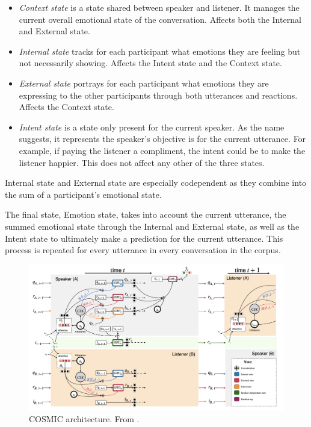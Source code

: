 \documentclass[nofilelist]{cslthse-msc}
\begin{document}
\begin{itemize}
    \item \textit{Context state} is a state shared between speaker and listener. It manages the current overall emotional state of the conversation. Affects both the Internal and External state.
    \item \textit{Internal state} tracks for each participant what emotions they are feeling but not necessarily showing. Affects the Intent state and the Context state.
    \item \textit{External state} portrays for each participant what emotions they are expressing to the other participants through both utterances and reactions. Affects the Context state.
    \item \textit{Intent state} is a state only present for the current speaker. As the name suggests, it represents the speaker's objective is for the current utterance. For example, if paying the listener a compliment, the intent could be to make the listener happier. This does not affect any other of the three states.
\end{itemize}
Internal state and External state are especially codependent as they combine into the sum of a participant's emotional state. 

The final state, Emotion state, takes into account the current utterance, the summed emotional state through the Internal and External state, as well as the Intent state to ultimately make a prediction for the current utterance. This process is repeated for every utterance in every conversation in the corpus.



\begin{figure}[!ht]
    \centering
    \includegraphics[scale=0.3]{msccls/explanatory_images/COSMIC_arch.png}
    \caption{COSMIC architecture. From \citet{ghosal2020cosmic}.}
    \label{fig:COSMIC_arch}
\end{figure}
\end{document}

